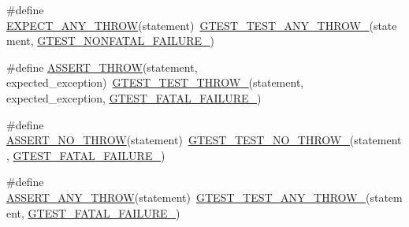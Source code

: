 \begin{DoxyCompactItemize}
\item 
\#define \mbox{\hyperlink{_obj__test_2lib_2googletest-master_2googletest_2include_2gtest_2gtest_8h_a9be43f44d148e8a8d6a89c864bf4e461}{E\+X\+P\+E\+C\+T\+\_\+\+A\+N\+Y\+\_\+\+T\+H\+R\+OW}}(statement)~\mbox{\hyperlink{_obj__test_2lib_2googletest-release-1_88_81_2googletest_2include_2gtest_2internal_2gtest-internal_8h_af48bbd26d54d4afc5e4cef39b1c76ba3}{G\+T\+E\+S\+T\+\_\+\+T\+E\+S\+T\+\_\+\+A\+N\+Y\+\_\+\+T\+H\+R\+O\+W\+\_\+}}(statement, \mbox{\hyperlink{_obj__test_2lib_2googletest-release-1_88_81_2googletest_2include_2gtest_2internal_2gtest-internal_8h_a6cb7482cfa03661a91c698eb5895f642}{G\+T\+E\+S\+T\+\_\+\+N\+O\+N\+F\+A\+T\+A\+L\+\_\+\+F\+A\+I\+L\+U\+R\+E\+\_\+}})
\item 
\#define \mbox{\hyperlink{_obj__test_2lib_2googletest-master_2googletest_2include_2gtest_2gtest_8h_aedb1eddae6c2a2430b0e7b7e03b4f052}{A\+S\+S\+E\+R\+T\+\_\+\+T\+H\+R\+OW}}(statement,  expected\+\_\+exception)~\mbox{\hyperlink{_obj__test_2lib_2googletest-release-1_88_81_2googletest_2include_2gtest_2internal_2gtest-internal_8h_a3f71db93eaf30b0cfca9612b9ac32106}{G\+T\+E\+S\+T\+\_\+\+T\+E\+S\+T\+\_\+\+T\+H\+R\+O\+W\+\_\+}}(statement, expected\+\_\+exception, \mbox{\hyperlink{_obj__test_2lib_2googletest-release-1_88_81_2googletest_2include_2gtest_2internal_2gtest-internal_8h_a0f9a4c3ea82cc7bf4478eaffdc168358}{G\+T\+E\+S\+T\+\_\+\+F\+A\+T\+A\+L\+\_\+\+F\+A\+I\+L\+U\+R\+E\+\_\+}})
\item 
\#define \mbox{\hyperlink{_obj__test_2lib_2googletest-master_2googletest_2include_2gtest_2gtest_8h_a895c34d9b192cdc2ba46d2680623485d}{A\+S\+S\+E\+R\+T\+\_\+\+N\+O\+\_\+\+T\+H\+R\+OW}}(statement)~\mbox{\hyperlink{_obj__test_2lib_2googletest-release-1_88_81_2googletest_2include_2gtest_2internal_2gtest-internal_8h_a9a109d026b5a904646437d7570e13581}{G\+T\+E\+S\+T\+\_\+\+T\+E\+S\+T\+\_\+\+N\+O\+\_\+\+T\+H\+R\+O\+W\+\_\+}}(statement, \mbox{\hyperlink{_obj__test_2lib_2googletest-release-1_88_81_2googletest_2include_2gtest_2internal_2gtest-internal_8h_a0f9a4c3ea82cc7bf4478eaffdc168358}{G\+T\+E\+S\+T\+\_\+\+F\+A\+T\+A\+L\+\_\+\+F\+A\+I\+L\+U\+R\+E\+\_\+}})
\item 
\#define \mbox{\hyperlink{_obj__test_2lib_2googletest-master_2googletest_2include_2gtest_2gtest_8h_affadeef9379fe5aabf6f28d9eab9d3c0}{A\+S\+S\+E\+R\+T\+\_\+\+A\+N\+Y\+\_\+\+T\+H\+R\+OW}}(statement)~\mbox{\hyperlink{_obj__test_2lib_2googletest-release-1_88_81_2googletest_2include_2gtest_2internal_2gtest-internal_8h_af48bbd26d54d4afc5e4cef39b1c76ba3}{G\+T\+E\+S\+T\+\_\+\+T\+E\+S\+T\+\_\+\+A\+N\+Y\+\_\+\+T\+H\+R\+O\+W\+\_\+}}(statement, \mbox{\hyperlink{_obj__test_2lib_2googletest-release-1_88_81_2googletest_2include_2gtest_2internal_2gtest-internal_8h_a0f9a4c3ea82cc7bf4478eaffdc168358}{G\+T\+E\+S\+T\+\_\+\+F\+A\+T\+A\+L\+\_\+\+F\+A\+I\+L\+U\+R\+E\+\_\+}})

\end{DoxyCompactItemize}
